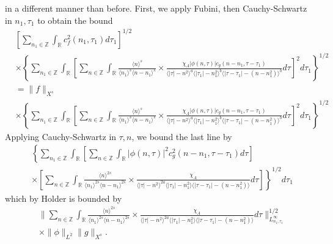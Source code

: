 \documentclass[12pt,reqno]{amsart}
\numberwithin{equation}{section}  %
\numberwithin{figure}{section}
\newcommand{\rr}{\mathbb{R}}
\newcommand{\zz}{\mathbb{Z}}
\theoremstyle{plain}
\theoremstyle{definition}
\theoremstyle{remark}
\begin{document}
in a different manner than before. First, we apply 
Fubini, then Cauchy-Schwartz in $n_{1}, \tau_{1}$ to obtain the bound
%
%
\begin{equation*}
\begin{split}
  & \left[ \sum_{n_{1} \in \zz} \int_{\rr} c_{f}^{2}(n_{1}, \tau_{1}) d \tau_{1}
  \right]^{1/2}
  \\
  & \times \left \{ \sum_{n_{1} \in \zz} \int_{\rr}   
 \left[
 \sum_{n \in \zz} \int_{\rr}
   \frac{\langle n \rangle ^{s}}{\langle n_{1} \rangle ^{s} \langle
   n - n_{1}\rangle ^{s}} \times \frac{\chi_{A} |\phi(n, \tau)| c_{g}(n -
   n_{1}, \tau - \tau_{1})
}{\langle | \tau | - n^{2} \rangle
  ^{a} \langle | \tau_{1} | - n_{1}^{2} \rangle ^{b} \langle | \tau -
  \tau_{1} | - (n - n_{1}^{2}) \rangle ^{b}} d \tau 
  \right]^{2} d \tau_{1} \right \}^{1/2}
  \\
  & = \| f \|_{X^{s}}
  \\
  & \times \left \{ \sum_{n_{1} \in \zz} \int_{\rr}   
 \left[
 \sum_{n \in \zz} \int_{\rr}
   \frac{\langle n \rangle ^{s}}{\langle n_{1} \rangle ^{s} \langle
   n - n_{1}\rangle ^{s}} \times \frac{\chi_{A}|\phi(n, \tau)| c_{g}(n -
   n_{1}, \tau - \tau_{1})
}{\langle | \tau | - n^{2} \rangle
  ^{a} \langle | \tau_{1} | - n_{1}^{2} \rangle ^{b} \langle | \tau -
  \tau_{1} | - (n - n_{1}^{2}) \rangle ^{b}} d \tau 
  \right]^{2} d \tau_{1}  \right \}^{1/2}
\end{split}
\end{equation*}
%
Applying Cauchy-Schwartz in $\tau, n$, we bound the last line by 
%
%
\begin{equation*}
\begin{split}
  & \left \{ \sum_{n_{1} \in \zz} \int_{\rr}   
  \left [ \sum_{n \in \zz} \int_{\rr}
  | \phi(n, \tau)|^{2} c_{g}^{2}(n - n_{1}, \tau - \tau_{1}) d \tau  
    \right ] \right . 
   \\
   & \left. \times \left [ \sum_{n \in \zz} \int_{\rr} \frac{\langle n \rangle
   ^{2s}}{\langle n_{1} \rangle ^{2s} \langle n - n_{1}\rangle ^{2s}}
   \times \frac{\chi_{A}}{\langle | \tau | - n^{2} \rangle ^{2a} \langle | \tau_{1} |
   - n_{1}^{2} \rangle  \langle | \tau - \tau_{1} | - (n - n_{1}^{2})
   \rangle } d \tau  \right ] \right \}^{1/2}d \tau_{1} 
\end{split}
\end{equation*}
%
%
which by Holder is bounded by 
%
%
%
\begin{equation}
  \label{integral-bound-2nd-form-per}
\begin{split}
  & \| \sum_{n \in \zz} \int_{\rr} \frac{\langle n \rangle ^{2s}}{\langle n_{1} \rangle ^{2s} \langle
  n - n_{1}\rangle ^{2s}}  \times \frac{\chi_{A}}{\langle | \tau | - n^{2} \rangle
  ^{2a} \langle | \tau_{1} | - n_{1}^{2} \rangle  \langle | \tau -
  \tau_{1} | - (n - n_{1}^{2}) \rangle } d \tau 
  \|_{L^{\infty}_{n_{1}, \tau_{1}}}^{1/2}
  \\
  & \times \|\phi\|_{L^{2}} \| g \|_{X^{s}}.
\end{split}
\end{equation}
\end{document}
